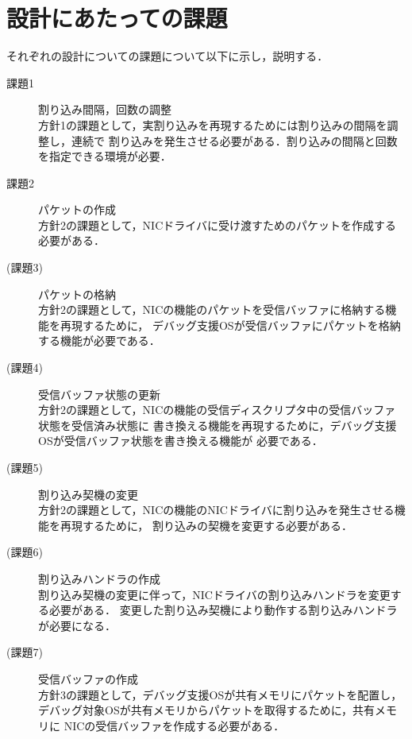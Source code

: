 \documentclass[tanilab-enum]{graduate}
\begin{document}
\section{設計にあたっての課題}
それぞれの設計についての課題について以下に示し，説明する．
\begin{description}
    \item[課題1]割り込み間隔，回数の調整\\
        方針1の課題として，実割り込みを再現するためには割り込みの間隔を調整し，連続で
        割り込みを発生させる必要がある．割り込みの間隔と回数を指定できる環境が必要．
    \item[課題2]パケットの作成\\
        方針2の課題として，NICドライバに受け渡すためのパケットを作成する必要がある．
    \item[(課題3)]パケットの格納\\
        方針2の課題として，NICの機能のパケットを受信バッファに格納する機能を再現するために，
        デバッグ支援OSが受信バッファにパケットを格納する機能が必要である．
    \item[(課題4)]受信バッファ状態の更新\\
        方針2の課題として，NICの機能の受信ディスクリプタ中の受信バッファ状態を受信済み状態に
        書き換える機能を再現するために，デバッグ支援OSが受信バッファ状態を書き換える機能が
        必要である．
    \item[(課題5)]割り込み契機の変更\\
        方針2の課題として，NICの機能のNICドライバに割り込みを発生させる機能を再現するために，
        割り込みの契機を変更する必要がある．
    \item[(課題6)]割り込みハンドラの作成\\
        割り込み契機の変更に伴って，NICドライバの割り込みハンドラを変更する必要がある．
        変更した割り込み契機により動作する割り込みハンドラが必要になる．
    \item[(課題7)]受信バッファの作成\\
        方針3の課題として，デバッグ支援OSが共有メモリにパケットを配置し，
        デバッグ対象OSが共有メモリからパケットを取得するために，共有メモリに
        NICの受信バッファを作成する必要がある．
\end{description}
\end{document}
